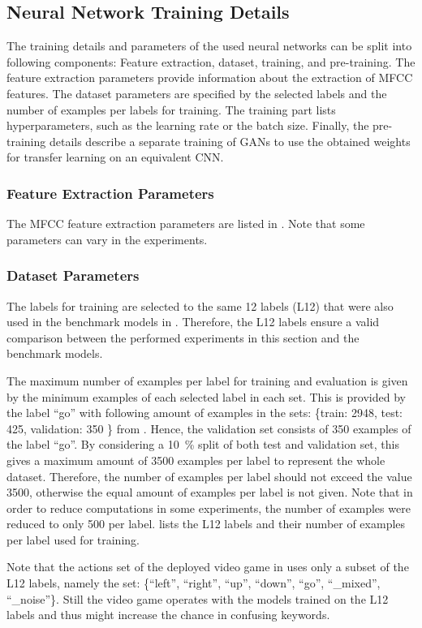 
\subsection{Neural Network Training Details}\label{sec:exp_details_training}
The training details and parameters of the used neural networks can be split into following components: Feature extraction, dataset, training, and pre-training.
The feature extraction parameters provide information about the extraction of MFCC features.
The dataset parameters are specified by the selected labels and the number of examples per labels for training.
The training part lists hyperparameters, such as the learning rate or the batch size.
Finally, the pre-training details describe a separate training of GANs to use the obtained weights for transfer learning on an equivalent CNN.



\subsubsection{Feature Extraction Parameters}
The MFCC feature extraction parameters are listed in .
Note that some parameters can vary in the experiments.




\subsubsection{Dataset Parameters}
The labels for training are selected to the same 12 labels (L12) that were also used in the benchmark models in .
Therefore, the L12 labels ensure a valid comparison between the performed experiments in this section and the benchmark models.

The maximum number of examples per label for training and evaluation is given by the minimum examples of each selected label in each set.
This is provided by the label \enquote{go} with following amount of examples in the sets: \{train: 2948, test: 425, validation: 350 \} from .
Hence, the validation set consists of 350 examples of the label \enquote{go}.
By considering a \SI{10}{\percent} split of both test and validation set, this gives a maximum amount of 3500 examples per label to represent the whole dataset.
Therefore, the number of examples per label should not exceed the value 3500, otherwise the equal amount of examples per label is not given.
Note that in order to reduce computations in some experiments, the number of examples were reduced to only 500 per label.
 lists the L12 labels and their number of examples per label used for training.

Note that the actions set of the deployed video game in  uses only a subset of the L12 labels, namely the set: \{\enquote{left},  \enquote{right}, \enquote{up}, \enquote{down}, \enquote{go}, \enquote{\_mixed}, \enquote{\_noise}\}.
Still the video game operates with the models trained on the L12 labels and thus might increase the chance in confusing keywords.


